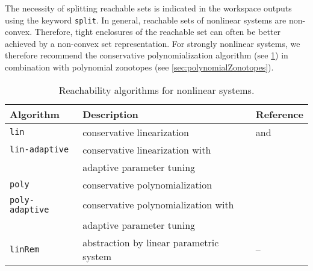 The necessity of splitting reachable sets is indicated in the workspace outputs using the keyword \texttt{split}. In general, reachable sets of nonlinear systems are non-convex. Therefore, tight enclosures of the reachable set can often be better achieved by a non-convex set representation. For strongly nonlinear systems, we therefore recommend the conservative polynomialization algorithm (see \cref{tab:nonlinAlg}) in combination with polynomial zonotopes (see \cref{sec:polynomialZonotopes}).

\begin{table}[h]
	\caption{Reachability algorithms for nonlinear systems.}
	\centering
	\label{tab:nonlinAlg}
	\begin{tabular}{lll}
		\toprule
		\textbf{Algorithm} & \textbf{Description} & \textbf{Reference} \\
		\midrule
		\texttt{lin} & conservative linearization & \cite{Althoff2008c} and \cite[Section 3.4]{Althoff2010a} \\
		\texttt{lin-adaptive} & conservative linearization with & \cite{Wetzlinger2021} \\
		& adaptive parameter tuning & \\
		\texttt{poly} & conservative polynomialization & \cite{Althoff2013a}\\
		\texttt{poly-adaptive} & conservative polynomialization with & \cite{Wetzlinger2021} \\
		& adaptive parameter tuning & \\
		\texttt{linRem} & abstraction by linear parametric system & -- \\
		\bottomrule
	\end{tabular}
\end{table}


